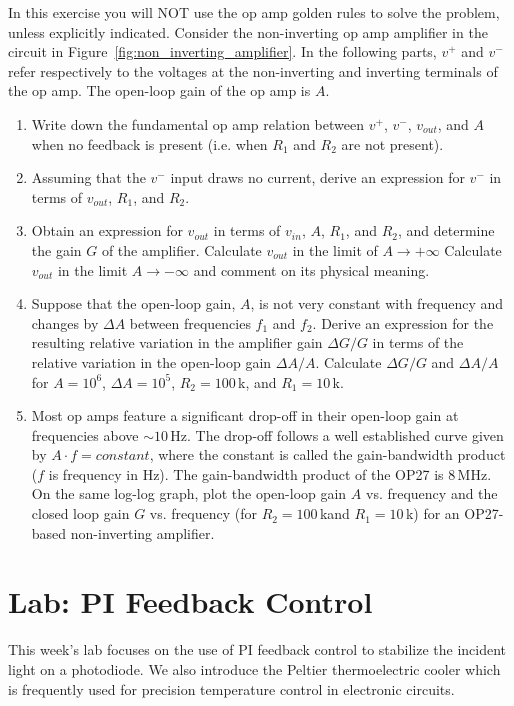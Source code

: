\documentclass{article}
\begin{document}
\begin{enumerate}
In this exercise you will NOT use the op amp golden rules to solve the problem, unless explicitly indicated.  Consider the non-inverting op amp amplifier in the circuit in Figure~\ref{fig:non_inverting_amplifier}.  In the following parts, $v^+$ and $v^-$ refer respectively to the voltages at the non-inverting and inverting terminals of the op amp. The open-loop gain of the op amp is $A$.
\begin{enumerate}
\item Write down the fundamental op amp relation between $v^+$, $v^-$, $v_{out}$, and $A$ when no feedback is present (i.e. when $R_1$ and $R_2$ are not present).
\item Assuming that the $v^-$ input draws no current, derive an expression for $v^-$ in terms of $v_{out}$, $R_1$, and $R_2$.
\item Obtain an expression for $v_{out}$ in terms of $v_{in}$, $A$, $R_1$, and $R_2$, and determine the gain $G$ of the amplifier. Calculate $v_{out}$ in the limit of $A \to +\infty$ Calculate $v_{out}$ in the limit $A \to -\infty$ and comment on its physical meaning.
\item Suppose that the open-loop gain, $A$, is not very constant with frequency and changes by $\Delta A$ between frequencies $f_1$ and $f_2$. Derive an expression for the resulting relative variation in the amplifier gain $\Delta G / G$ in terms of the relative variation in the open-loop gain $\Delta A / A$. Calculate $\Delta G / G$ and $\Delta A / A$ for $A = 10^6$, $\Delta A = 10^5$,  $R_2 = 100$\,k\Ohm, and $R_1 = 10$\,k\Ohm.
\item Most op amps feature a significant drop-off in their open-loop gain at frequencies above $\sim 10$\,Hz. The drop-off follows a well established curve given by $A \cdot f = constant$, where the constant is called the gain-bandwidth product ($f$ is frequency in Hz). The gain-bandwidth product of the OP27 is 8\,MHz. On the same log-log graph, plot the open-loop gain $A$ vs. frequency and the closed loop gain $G$ vs. frequency (for $R_2 = 100$\,k\Ohm and $R_1 = 10$\,k\Ohm) for an OP27-based non-inverting amplifier.
\end{enumerate}
\end{enumerate}

\section{Lab: PI Feedback Control}

This week's lab focuses on the use of PI feedback control to stabilize the incident light on a photodiode. We also introduce the Peltier thermoelectric cooler which is frequently used for precision temperature control in electronic circuits.
\end{document}

